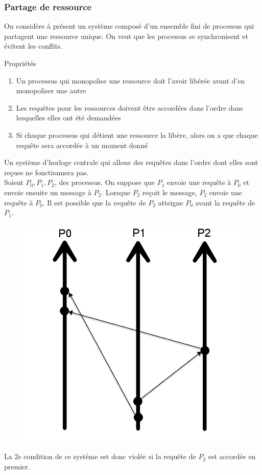 \documentclass[compress]{beamer}
\begin{document}
\begin{frame}
\frametitle{Partage de ressource}
On considère à présent un système composé d'un ensemble fini de processus qui partagent une ressource unique. On veut que les processus se synchronisent et évitent les conflits.
\begin{block}{Propriétés}
\begin{enumerate}
\item Un processus qui monopolise une ressource doit l'avoir libérée avant d'en monopoliser une autre
\item Les requêtes pour les ressources doivent être accordées dans l'ordre dans lesquelles elles ont été demandées
\item Si chaque processus qui détient une ressource la libère, alors on a que chaque requête sera accordée à un moment donné
\end{enumerate}
\end{block}
\end{frame}

\begin{frame}
Un système d'horloge centrale qui alloue des requêtes dans l'ordre dont elles sont reçues ne fonctionnera pas.\\
Soient $P_0, P_1, P_2$, des processus. On suppose que $P_1$ envoie une requête à $P_0$ et envoie ensuite
un message à $P_2$. Lorsque $P_2$ reçoit le message, $P_2$ envoie une requête à $P_0$. Il est possible que la requête de $P_2$ atteigne $P_0$ avant la requête de $P_1$.
\begin{figure}\includegraphics[scale=0.12]{process4.png}\end{figure}
La 2e condition de ce système est donc violée si la requête de $P_2$ est accordée en premier.
\end{frame}
\end{document}

